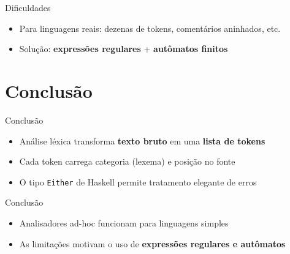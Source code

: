 \begin{frame}{Dificuldades}

    \begin{itemize}

        \item
        Para linguagens reais: dezenas de tokens, comentários aninhados, etc.
        \item
        Solução: \textbf{expressões regulares} + \textbf{autômatos finitos}
    \end{itemize}
\end{frame}


\section{Conclusão}\label{conclusuxe3o}

\begin{frame}[fragile]{Conclusão}

    \begin{itemize}

        \item
        Análise léxica transforma \textbf{texto bruto} em uma \textbf{lista de
        tokens}
        \item
        Cada token carrega categoria (lexema) e posição no fonte
        \item
        O tipo \texttt{Either} de Haskell permite tratamento
        elegante de erros
    \end{itemize}
\end{frame}

\begin{frame}{Conclusão}

    \begin{itemize}

        \item
        Analisadores ad-hoc funcionam para linguagens simples
        \item
        As limitações motivam o uso de \textbf{expressões regulares e
        autômatos}
    \end{itemize}
\end{frame}
